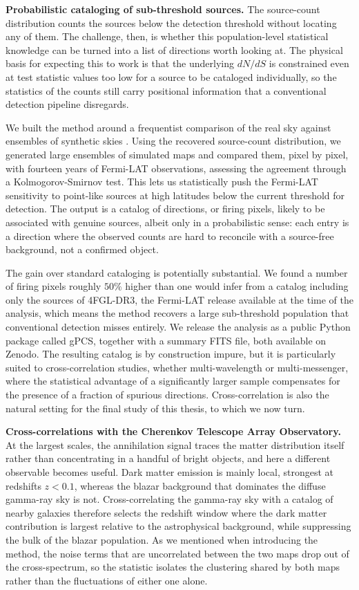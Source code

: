 \textbf{Probabilistic cataloging of sub-threshold sources.} The source-count distribution counts the sources below the detection threshold without locating any of them. The challenge, then, is whether this population-level statistical knowledge can be turned into a list of directions worth looking at. The physical basis for expecting this to work is that the underlying $dN/dS$ is constrained even at test statistic values too low for a source to be cataloged individually, so the statistics of the counts still carry positional information that a conventional detection pipeline disregards.

We built the method around a frequentist comparison of the real sky against ensembles of synthetic skies \cite{Amerio:2023rjn}. Using the recovered source-count distribution, we generated large ensembles of simulated maps and compared them, pixel by pixel, with fourteen years of Fermi-LAT observations, assessing the agreement through a Kolmogorov-Smirnov test. This lets us statistically push the Fermi-LAT sensitivity to point-like sources at high latitudes below the current threshold for detection. The output is a catalog of directions, or firing pixels, likely to be associated with genuine sources, albeit only in a probabilistic sense: each entry is a direction where the observed counts are hard to reconcile with a source-free background, not a confirmed object.

The gain over standard cataloging is potentially substantial. We found a number of firing pixels roughly $50\%$ higher than one would infer from a catalog including only the sources of 4FGL-DR3, the Fermi-LAT release available at the time of the analysis, which means the method recovers a large sub-threshold population that conventional detection misses entirely. We release the analysis as a public Python package called gPCS, together with a summary FITS file, both available on Zenodo. The resulting catalog is by construction impure, but it is particularly suited to cross-correlation studies, whether multi-wavelength or multi-messenger, where the statistical advantage of a significantly larger sample compensates for the presence of a fraction of spurious directions. Cross-correlation is also the natural setting for the final study of this thesis, to which we now turn.

\textbf{Cross-correlations with the Cherenkov Telescope Array Observatory.} At the largest scales, the annihilation signal traces the matter distribution itself rather than concentrating in a handful of bright objects, and here a different observable becomes useful. Dark matter emission is mainly local, strongest at redshifts $z < 0.1$, whereas the blazar background that dominates the diffuse gamma-ray sky is not. Cross-correlating the gamma-ray sky with a catalog of nearby galaxies therefore selects the redshift window where the dark matter contribution is largest relative to the astrophysical background, while suppressing the bulk of the blazar population. As we mentioned when introducing the method, the noise terms that are uncorrelated between the two maps drop out of the cross-spectrum, so the statistic isolates the clustering shared by both maps rather than the fluctuations of either one alone.

